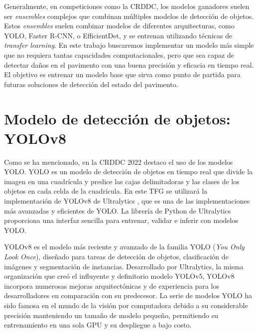 Generalmente, en competiciones como la CRDDC, los modelos ganadores suelen ser \textit{ensembles} complejos que combinan múltiples modelos de detección de objetos. Estos \textit{ensembles} suelen combinar modelos de diferentes arquitecturas, como YOLO, Faster R-CNN, o EfficientDet, y se entrenan utilizando técnicas de \textit{transfer learning}. En este trabajo buscaremos implementar un modelo más simple que no requiera tantas capacidades computacionales, pero que sea capaz de detectar daños en el pavimento con una buena precisión y eficacia en tiempo real. El objetivo es entrenar un modelo base que sirva como punto de partida para futuras soluciones de detección del estado del pavimento.


\section{Modelo de detección de objetos: YOLOv8}
Como se ha mencionado, en la CRDDC 2022 destaco el uso de los modelos YOLO. YOLO \cite{YOLO} es un modelo de detección de objetos en tiempo real que divide la imagen en una cuadrícula y predice las cajas delimitadoras y las clases de los objetos en cada celda de la cuadrícula. En este TFG se utilizará la implementación de YOLOv8 de Ultralytics \cite{yolov8_ultralytics}, que es una de las implementaciones más avanzadas y eficientes de YOLO. La librería de Python de Ultralytics proporciona una interfaz sencilla para entrenar, validar e inferir con modelos YOLO.

YOLOv8 es el modelo más reciente y avanzado de la familia YOLO (\textit{You Only Look Once}), diseñado para tareas de detección de objetos, clasificación de imágenes y segmentación de instancias. Desarrollado por Ultralytics, la misma organización que creó el influyente y definitorio modelo YOLOv5, YOLOv8 incorpora numerosas mejoras arquitectónicas y de experiencia para los desarrolladores en comparación con su predecesor. La serie de modelos YOLO ha sido famosa en el mundo de la visión por computadora debido a su considerable precisión manteniendo un tamaño de modelo pequeño, permitiendo su entrenamiento en una sola GPU y su despliegue a bajo costo.

